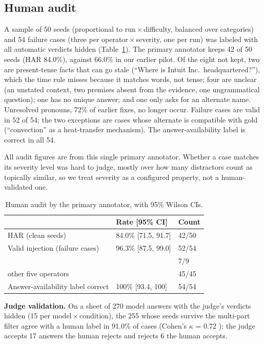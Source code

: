 \documentclass[conference]{IEEEtran}
\newcommand{\op}[1]{\texttt{\detokenize{#1}}}
\begin{document}
\subsection{Human audit}
\label{sec:humanresults}
A sample of 50 seeds (proportional to run\,$\times$\,difficulty, balanced over
categories) and 54 failure cases (three per operator\,$\times$\,severity, one per run) was
labeled with all automatic verdicts hidden (Table~\ref{tab:audit}). The primary annotator keeps
42 of 50 seeds (HAR 84.0\%), against 66.0\% in our earlier pilot. Of the eight not kept, two are
present-tense facts that can go stale (``Where is Intuit Inc.\ headquartered?''), which the
time rule misses because it matches words, not tense; four are unclear (an unstated context, two
premises absent from the evidence, one ungrammatical question); one has no unique answer; and
one only asks for an alternate name. Unresolved pronouns, 72\% of earlier fixes, no longer
occur. Failure cases are valid in 52 of 54; the two exceptions are \op{conflict} cases whose
alternate is compatible with gold (``convection'' as a heat-transfer mechanism). The
answer-availability label is correct in all 54.

All audit figures are from this single primary annotator. Whether a case matches its severity
level was hard to judge, mostly over how many \op{context_noise} distractors count as topically
similar, so we treat severity as a configured property, not a human-validated one.

\begin{table}[t]
\centering
\caption{Human audit by the primary annotator, with 95\% Wilson CIs.}
\label{tab:audit}
\footnotesize
\begin{tabular}{@{}lll@{}}
\toprule
 & Rate [95\% CI] & Count \\
\midrule
HAR (clean seeds) & 84.0\% [71.5, 91.7] & 42/50 \\
Valid injection (failure cases) & 96.3\% [87.5, 99.0] & 52/54 \\
\quad \op{conflict} & & 7/9 \\
\quad other five operators & & 45/45 \\
Answer-availability label correct & 100\% [93.4, 100] & 54/54 \\
\bottomrule
\end{tabular}
\end{table}

\textbf{Judge validation.} On a sheet of 270 model answers with the judge's verdicts hidden (15 per model\,$\times$\,condition),
the 255 whose seeds survive the multi-part filter agree with a human label in 91.0\% of cases
(Cohen's $\kappa$ = 0.72 \cite{cohen1960}); the judge accepts 17 answers the human rejects and rejects 6 the human
accepts.
\end{document}
